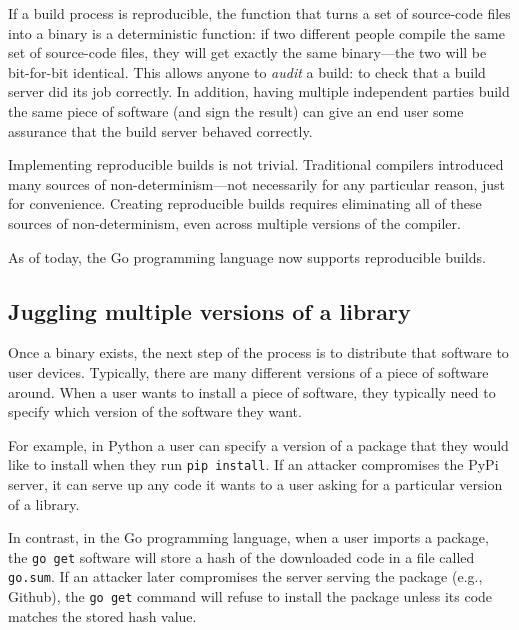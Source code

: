 \documentclass[
  letterpaper,
]{scrbook}
\theoremstyle{definition}
\theoremstyle{plain}
\theoremstyle{plain}
\theoremstyle{remark}
\begin{document}
If a build process is reproducible, the function that turns a set of
source-code files into a binary is a deterministic function: if two
different people compile the same set of source-code files, they will
get exactly the same binary---the two will be bit-for-bit identical.
This allows anyone to \emph{audit} a build: to check that a build server
did its job correctly. In addition, having multiple independent parties
build the same piece of software (and sign the result) can give an end
user some assurance that the build server behaved correctly.

Implementing reproducible builds is not trivial. Traditional compilers
introduced many sources of non-determinism---not necessarily for any
particular reason, just for convenience. Creating reproducible builds
requires eliminating all of these sources of non-determinism, even
across multiple versions of the compiler.

As of today, the Go programming language now supports reproducible
builds.

\subsection{Juggling multiple versions of a
library}\label{juggling-multiple-versions-of-a-library}

Once a binary exists, the next step of the process is to distribute that
software to user devices. Typically, there are many different versions
of a piece of software around. When a user wants to install a piece of
software, they typically need to specify which version of the software
they want.

For example, in Python a user can specify a version of a package that
they would like to install when they run \texttt{pip\ install}. If an
attacker compromises the PyPi server, it can serve up any code it wants
to a user asking for a particular version of a library.

In contrast, in the Go programming language, when a user imports a
package, the \texttt{go\ get} software will store a hash of the
downloaded code in a file called \texttt{go.sum}. If an attacker later
compromises the server serving the package (e.g., Github), the
\texttt{go\ get} command will refuse to install the package unless its
code matches the stored hash value.

\end{document}

